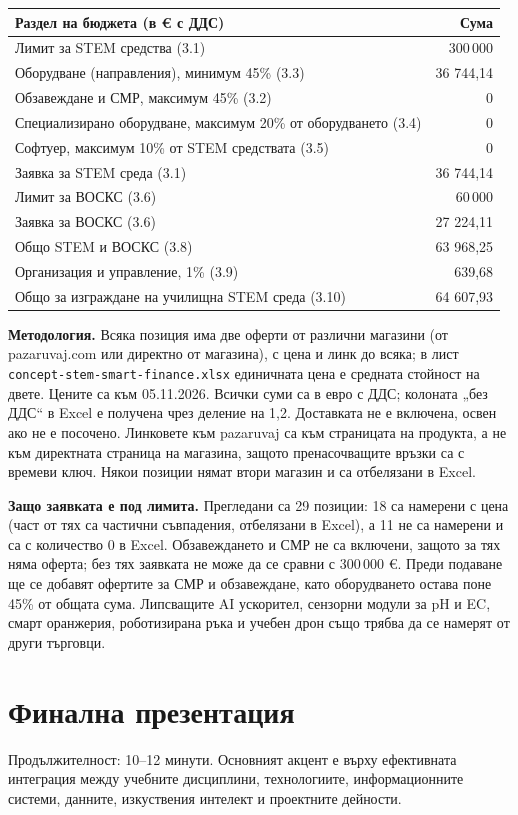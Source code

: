 \documentclass[11pt,a4paper]{article}
\begin{document}
\begin{tabularx}{\textwidth}{@{}Xr@{}}
\toprule
Раздел на бюджета (в € с ДДС) & Сума \\
\midrule
Лимит за STEM средства (3.1) & 300\,000 \\
Оборудване (направления), минимум 45\% (3.3) & 36 744{,}14 \\
Обзавеждане и СМР, максимум 45\% (3.2) & 0 \\
Специализирано оборудване, максимум 20\% от оборудването (3.4) & 0 \\
Софтуер, максимум 10\% от STEM средствата (3.5) & 0 \\
Заявка за STEM среда (3.1) & 36 744{,}14 \\
Лимит за ВОСКС (3.6) & 60\,000 \\
Заявка за ВОСКС (3.6) & 27 224{,}11 \\
Общо STEM и ВОСКС (3.8) & 63 968{,}25 \\
Организация и управление, 1\% (3.9) & 639{,}68 \\
Общо за изграждане на училищна STEM среда (3.10) & 64 607{,}93 \\
\bottomrule
\end{tabularx}

\textbf{Методология.} Всяка позиция има две оферти от различни магазини (от pazaruvaj.com или директно от магазина), с цена и линк до всяка; в лист \texttt{concept-stem-smart-finance.xlsx} единичната цена е средната стойност на двете. Цените са към 05.11.2026. Всички суми са в евро с ДДС; колоната „без ДДС“ в Excel е получена чрез деление на 1{,}2. Доставката не е включена, освен ако не е посочено. Линковете към pazaruvaj са към страницата на продукта, а не към директната страница на магазина, защото пренасочващите връзки са с времеви ключ. Някои позиции нямат втори магазин и са отбелязани в Excel.

\textbf{Защо заявката е под лимита.} Прегледани са 29 позиции: 18 са намерени с цена (част от тях са частични съвпадения, отбелязани в Excel), а 11 не са намерени и са с количество 0 в Excel. Обзавеждането и СМР не са включени, защото за тях няма оферта; без тях заявката не може да се сравни с 300\,000 €. Преди подаване ще се добавят офертите за СМР и обзавеждане, като оборудването остава поне 45\% от общата сума. Липсващите AI ускорител, сензорни модули за pH и EC, смарт оранжерия, роботизирана ръка и учебен дрон също трябва да се намерят от други търговци.

\section{Финална презентация}

Продължителност: 10--12 минути. Основният акцент е върху ефективната интеграция между учебните дисциплини, технологиите, информационните системи, данните, изкуствения интелект и проектните дейности.
\end{document}
